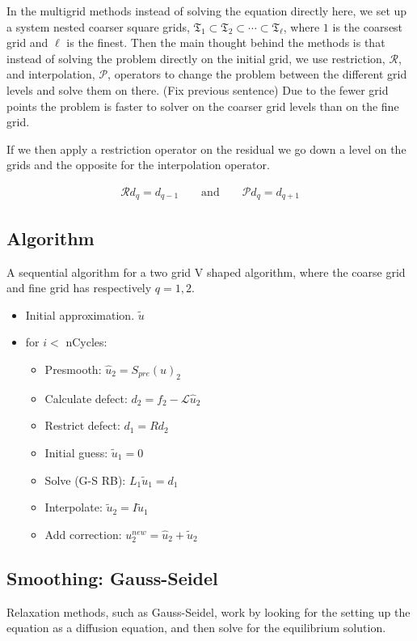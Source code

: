 		In the multigrid methods instead of solving the equation directly here, we set up a system nested coarser square grids, \(\mathfrak{T}_1 \subset \mathfrak{T}_2 \subset \cdots \subset \mathfrak{T}_\ell\), where \(1\) is the coarsest grid and \(\ell\) is the finest. Then the main thought behind the methods is that instead of solving the problem directly on the initial grid, we use restriction, \( \mathcal{R} \), and interpolation, \( \mathcal{P} \), operators to change the problem between the different grid levels and solve them on there. (Fix previous sentence) Due to the fewer grid points the problem is faster to solver on the coarser grid levels than on the fine grid.

		If we then apply a restriction operator on the residual we go down a level on the grids and the opposite for the interpolation operator.

		\begin{align}
			\mathcal{R} d_q = d_{q-1} \qquad \text{and} \qquad \mathcal{P} d_q = d_{q + 1}  
		\end{align}


		\subsection{Algorithm}
			A sequential algorithm for a two grid V shaped algorithm, where the coarse grid and fine grid has respectively \(q = 1,2\).

		\begin{itemize}
			\item Initial approximation. \(\tilde{u}\) 
			\item for \(i < \) nCycles:
				\begin{itemize}
					\item Presmooth: \(\hat{u}_2 = S_{pre}(u)_2\)
					\item Calculate defect: \( d_2 = f_2 - \mathcal{L}\hat{u}_2\)
					\item Restrict defect: \( d_1 = Rd_2 \)
					\item Initial guess: 	\( \tilde{u}_1 = 0 \)
					\item Solve (G-S RB): 	\( L_1 \tilde{u}_1 = d_1 \)
					\item Interpolate:		\( \tilde{u}_2 = I \tilde{u}_1 \)
					\item Add correction:	\( u^{new}_2 = \hat{u}_2 + \tilde{u}_2 \)
				\end{itemize}
		\end{itemize}

		\subsection{Smoothing: Gauss-Seidel}
			Relaxation methods, such as Gauss-Seidel, work by looking for the setting up the equation as a diffusion equation, and then solve for the equilibrium solution.

